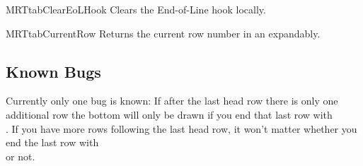 \begin{describemacro}{MRTtabClearEoLHook}%
  Clears the End-of-Line hook locally.
\end{describemacro}%

\begin{describemacro}{MRTtabCurrentRow}%
  Returns the current row number in an  expandably.
\end{describemacro}%

\subsection{Known Bugs}
Currently only one bug is known: If after the last head row there is only one
additional row the bottom  will only be drawn if you end that last row
with \texttt{\string\\}. If you have more rows following the last head row,
it won't matter whether you end the last row with \texttt{\string\\} or not.

